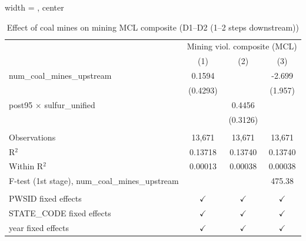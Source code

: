 
\begin{table}[htbp]
   
   \caption{\label{2sls_4step_d1_d2_mining_mcl_composite} Effect of coal mines on mining MCL composite (D1--D2 (1--2 steps downstream))}
   \bigskip
   
   \centering
   
   \begin{adjustbox}{width = \textwidth, center}
      
      
      \begin{tabular}{lccc}
         \toprule
         
          & \multicolumn{3}{c}{Mining viol. composite (MCL)}\\
         
                                                           & (1)           & (2)           & (3)\\  
         
         \midrule 
         num\_coal\_mines\_upstream                        & 0.1594        &               & -2.699\\   
                                                           & (0.4293)      &               & (1.957)\\   
         post95 $\times$ sulfur\_unified                   &               & 0.4456        &   \\   
                                                           &               & (0.3126)      &   \\   
         
          \\
         
         Observations                                      & 13,671        & 13,671        & 13,671\\  
         R$^2$                                             & 0.13718       & 0.13740       & 0.13740\\  
         Within R$^2$                                      & 0.00013       & 0.00038       & 0.00038\\  
         F-test (1st stage), num\_coal\_mines\_upstream    &               &               & 475.38\\  
         
          \\
         
         PWSID fixed effects                               & $\checkmark$  & $\checkmark$  & $\checkmark$\\   
         STATE\_CODE fixed effects                         & $\checkmark$  & $\checkmark$  & $\checkmark$\\   
         year fixed effects                                & $\checkmark$  & $\checkmark$  & $\checkmark$\\   
         

\end{tabular}
\end{adjustbox}
\end{table}
